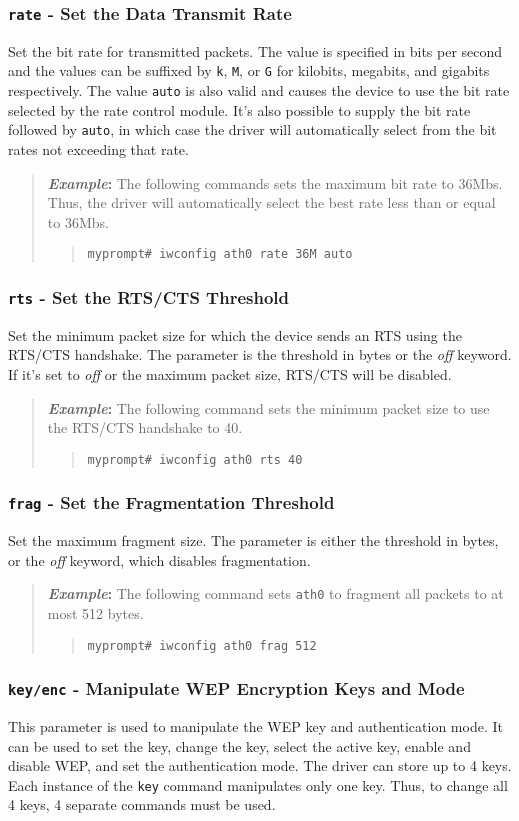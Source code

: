 \documentclass[10pt,fullpage]{article}
\newcommand{\mytt}[1]{{\texttt{#1}}}
\newcommand{\bv}{\begin{verse}}
\newcommand{\ev}{\end{verse}}
\newcommand{\cmd}[1]{{\texttt{myprompt\# #1}}}
\newcommand{\clival}[1]{{\emph{#1}}}
\newenvironment{example}{\begin{quote}\textbf{\textit{Example}:}}{\end{quote}}
\begin{document}
\subsubsection{\mytt{rate} - Set the Data Transmit Rate}
Set the bit rate for transmitted packets.  The value is specified in
bits per second and the values can be suffixed by \mytt{k}, \mytt{M}, or
\mytt{G} for kilobits, megabits, and gigabits respectively.  The value
\mytt{auto} is also valid and causes the device to use the bit rate
selected by the rate control module.  It's also possible to supply the
bit rate followed by \mytt{auto}, in which case the driver will
automatically select from the bit rates not exceeding that rate.
\begin{example}
  The following commands sets the maximum bit rate to 36Mbs.  Thus,
  the driver will automatically select the best rate less than or
  equal to 36Mbs.
  \bv
  \cmd{iwconfig ath0 rate 36M auto}
  \ev
\end{example}

\subsubsection{\mytt{rts} - Set the RTS/CTS Threshold}
Set the minimum packet size for which the device sends an RTS using the
RTS/CTS handshake.  The parameter is the threshold in bytes or the
\clival{off} keyword.  If it's set to \clival{off} or the maximum packet
size, RTS/CTS will be disabled.
\begin{example}
  The following command sets the minimum packet size to use the
  RTS/CTS handshake to 40.
  \bv
  \cmd{iwconfig ath0 rts 40}
  \ev
\end{example}

\subsubsection{\mytt{frag} - Set the Fragmentation Threshold}
Set the maximum fragment size.  The parameter is either the threshold in
bytes, or the \clival{off} keyword, which disables fragmentation.
\begin{example}
  The following command sets \mytt{ath0} to fragment all packets to at
  most 512 bytes.
  \bv 
  \cmd{iwconfig ath0 frag 512}
  \ev
\end{example}

\subsubsection{\mytt{key/enc} - Manipulate WEP Encryption Keys and Mode}
This parameter is used to manipulate the WEP key and authentication
mode.  It can be used to set the key, change the key, select the active
key, enable and disable WEP, and set the authentication mode.  The
driver can store up to 4 keys.  Each instance of the \mytt{key} command
manipulates only one key.  Thus, to change all 4 keys, 4 separate
commands must be used.
\end{document}
